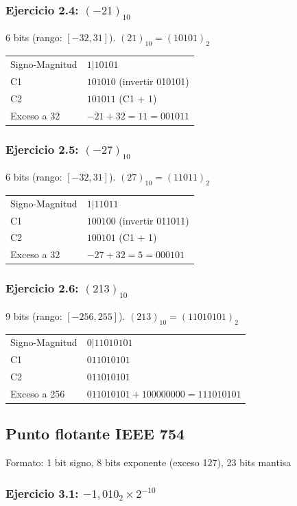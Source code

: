 \documentclass[12pt,a4paper]{article}
\begin{document}
\subsubsection{Ejercicio 2.4: $(-21)_{10}$}

6 bits (rango: $[-32, 31]$). $(21)_{10} = (10101)_2$

\begin{tabular}{ll}
Signo-Magnitud & $1|10101$ \\
C1 & $101010$ (invertir 010101) \\
C2 & $101011$ (C1 + 1) \\
Exceso a 32 & $-21 + 32 = 11 = 001011$
\end{tabular}

\subsubsection{Ejercicio 2.5: $(-27)_{10}$}

6 bits (rango: $[-32, 31]$). $(27)_{10} = (11011)_2$

\begin{tabular}{ll}
Signo-Magnitud & $1|11011$ \\
C1 & $100100$ (invertir 011011) \\
C2 & $100101$ (C1 + 1) \\
Exceso a 32 & $-27 + 32 = 5 = 000101$
\end{tabular}

\subsubsection{Ejercicio 2.6: $(213)_{10}$}

9 bits (rango: $[-256, 255]$). $(213)_{10} = (11010101)_2$

\begin{tabular}{ll}
Signo-Magnitud & $0|11010101$ \\
C1 & $011010101$ \\
C2 & $011010101$ \\
Exceso a 256 & $011010101 + 100000000 = 111010101$
\end{tabular}

\subsection{Punto flotante IEEE 754}

Formato: 1 bit signo, 8 bits exponente (exceso 127), 23 bits mantisa

\subsubsection{Ejercicio 3.1: $-1,010_2 \times 2^{-10}$}
\end{document}
